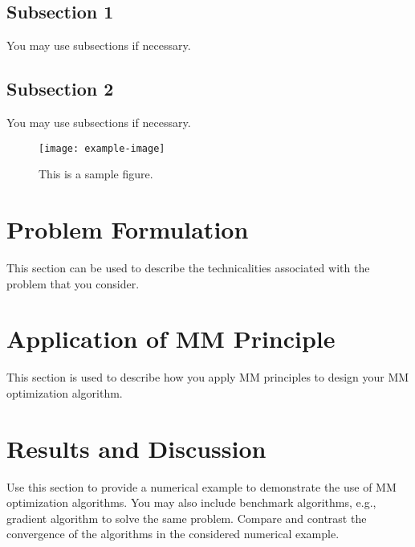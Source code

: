\documentclass[journal,onecolumn]{IEEEtran}
\begin{document}
\subsection{Subsection 1} 

You may use subsections if necessary.

\subsection{Subsection 2} 

You may use subsections if necessary.

%

	
\begin{figure}[h]
    \centering
	\texttt{[image: example-image]}
	\caption{This is a sample figure.}
	\label{fig:fig1}
\end{figure}

\section{Problem Formulation}

This section can be used to describe the technicalities associated with the problem that you consider. 
	
\section{Application of MM Principle} 
	
This section is used to describe how you apply MM principles to design your MM optimization algorithm. 
	
\section{Results and Discussion}

Use this section to provide a numerical example to demonstrate the use of MM optimization algorithms. You may also include benchmark algorithms, e.g., gradient algorithm to solve the same problem. Compare and contrast the convergence of the algorithms in the considered numerical example. 




	
\end{document}

